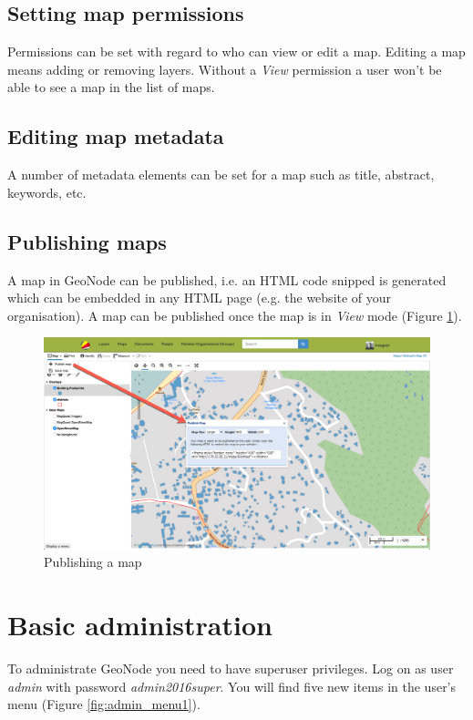 \documentclass[a4paper,12pt,titlepage]{article}
\begin{document}
\subsection{Setting map permissions}

Permissions can be set with regard to who can view or edit a map. Editing a map means adding or removing layers. Without a \textit{View} permission a user won't be able to see a map in the list of maps.

\subsection{Editing map metadata}

A number of metadata elements can be set for a map such as title, abstract, keywords, etc.

\subsection{Publishing maps}

A map in GeoNode can be published, i.e. an HTML code snipped is generated which can be embedded in any HTML page (e.g. the website of your organisation). A map can be published once the map is in \textit{View} mode (Figure \ref{fig:map3}).

\begin{figure}[H]
	\centering
	\includegraphics[width=12cm]{Images/map3.png}
	\caption{Publishing a map}\label{fig:map3}
\end{figure} 

\section{Basic administration}

To administrate GeoNode you need to have superuser privileges. Log on as user \textit{admin} with password \textit{admin2016super}. You will find five new items in the user's menu (Figure \ref{fig:admin_menu1}).
\end{document}
